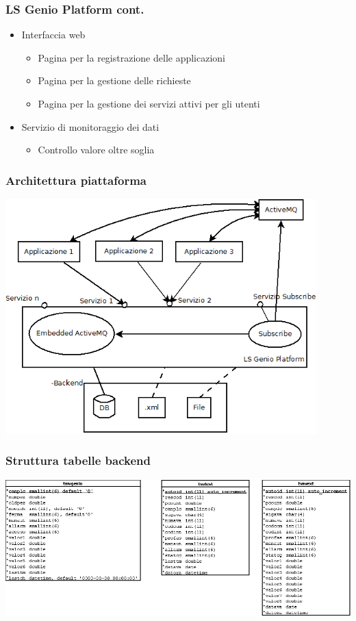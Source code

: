 \documentclass{beamer}
\begin{document}
\begin{frame}
	\frametitle{LS Genio Platform cont.}
	\begin{itemize}
		\item Interfaccia web
		\begin{itemize}
			\item Pagina per la registrazione delle applicazioni
			\item Pagina per la gestione delle richieste
			\item Pagina per la gestione dei servizi attivi per gli utenti
		\end{itemize}
	\item Servizio di monitoraggio dei dati
	\begin{itemize}
		\item Controllo valore oltre soglia
	\end{itemize}
	\end{itemize}
\end{frame}

\begin{frame}
\frametitle{Architettura piattaforma}
\includegraphics[width=0.9\textwidth]{images/architettura_piattaforma.png}
\end{frame}

\begin{frame}
\frametitle{Struttura tabelle backend}
\includegraphics[width=1\textwidth]{images/tabelle-backend.png}
\end{frame}
\end{document}
